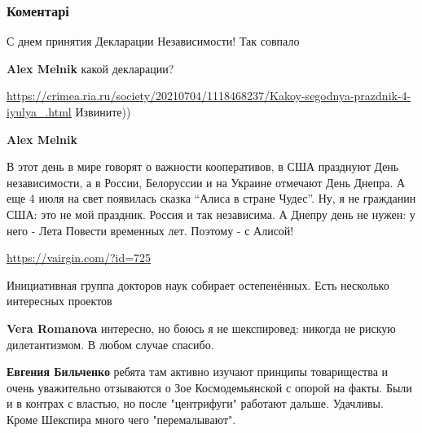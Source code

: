  
 
 
 
 
\subsubsection{Коментарі}

\begin{itemize}
С днем принятия Декларации Независимости!
Так совпало

\textbf{Alex Melnik} какой декларации?

\url{https://crimea.ria.ru/society/20210704/1118468237/Kakoy-segodnya-prazdnik-4-iyulya_.html}
Извините))

\textbf{Alex Melnik} 

В этот день в мире говорят о важности кооперативов, в США празднуют День
независимости, а в России, Белоруссии и на Украине отмечают День Днепра. А еще
4 июля на свет появилась сказка \enquote{Алиса в стране Чудес}. Ну, я не гражданин США:
это не мой праздник. Россия и так независима. А Днепру день не нужен: у него -
Лета Повести временных лет. Поэтому - с Алисой!

\url{https://vairgin.com/?id=725}\par
Инициативная группа докторов наук собирает остепенённых. Есть несколько интересных проектов

\textbf{Vera Romanova} интересно, но боюсь я не шекспировед: никогда не рискую дилетантизмом. В любом случае спасибо.

\textbf{Евгения Бильченко} ребята там активно изучают принципы товарищества и очень уважительно отзываются о Зое Космодемьянской с опорой на факты. Были и в контрах с властью, но после "центрифуги" работают дальше. Удачливы. Кроме Шекспира много чего "перемалывают".


\end{itemize}
